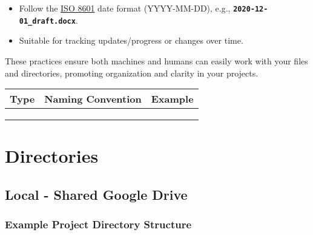\documentclass[
  letterpaper,
  DIV=11,
  numbers=noendperiod]{scrreprt}
\providecommand{\tightlist}{%
  \setlength{\itemsep}{0pt}\setlength{\parskip}{0pt}}\usepackage{longtable,booktabs,array}
\begin{document}
\begin{enumerate}
  \begin{itemize}
  \tightlist
  \item
    Follow the
    \href{https://www.iso.org/iso-8601-date-and-time-format.html}{ISO
    8601} date format (YYYY-MM-DD), e.g.,
    \textbf{\texttt{2020-12-01\_draft.docx}}.
  \item
    Suitable for tracking updates/progress or changes over time.
  \end{itemize}
\end{enumerate}

These practices ensure both machines and humans can easily work with
your files and directories, promoting organization and clarity in your
projects.

\begin{longtable}[]{@{}lll@{}}
\toprule\noalign{}
Type & Naming Convention & Example \\
\midrule\noalign{}
\endhead
\bottomrule\noalign{}
\endlastfoot
& & \\
& & \\
& & \\
\end{longtable}

\section*{Directories}\label{directories}


\subsection*{Local - Shared Google
Drive}\label{local---shared-google-drive}

\subsubsection*{Example Project Directory
Structure}\label{example-project-directory-structure}
\end{document}
